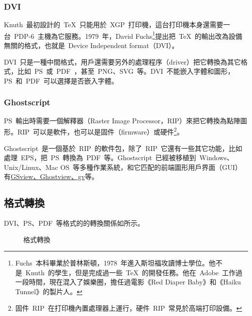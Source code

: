 \subsubsection{DVI}
\label{sec:dvi}
Knuth~最初設計的~\TeX~只能用於~XGP~打印機，這台打印機本身還需要一台~PDP-6~主機為它服務。1979~年，David Fuchs\footnote{Fuchs~本科畢業於普林斯頓，1978~年進入斯坦福攻讀博士學位。他不是~Knuth~的學生，但是完成過一些~\TeX~的開發任務。他在~Adobe~工作過一段時間，現在混入了娛樂圈，擔任過電影《Red Diaper Baby》和《Haiku Tunnel》的製片人。}提出把~\TeX~的輸出改為設備無關的格式，也就是~Device Independent format（DVI）。

DVI~只是一種中間格式，用戶還需要另外的處理程序（driver）把它轉換為其它格式，比如~PS~或~PDF~，甚至~PNG、SVG~等。DVI~不能嵌入字體和圖形，PS~和~PDF~可以選擇是否嵌入字體。

\subsubsection{Ghostscript}
\label{sec:ghostscript}
PS~輸出時需要一個解釋器（Raster Image Processor，RIP）來把它轉換為點陣圖形。RIP~可以是軟件，也可以是固件（firmware）或硬件\footnote{固件~RIP~在打印機內置處理器上運行，硬件~RIP~常見於高端打印設備。}。

Ghostscript~是一個基於~RIP~的軟件包，除了~RIP~它還有一些其它功能，比如處理~EPS，把~PS~轉換為~PDF~等。Ghostscript~已經被移植到~Windows、Unix/Linux、Mac OS~等多種作業系統，和它匹配的前端圖形用戶界面（GUI）有\href{http://pages.cs.wisc.edu/~ghost/}{GSview、Ghostview、gv}等。

\subsection{格式轉換}
\label{sec:convert_format}
DVI、PS、PDF~等格式的的轉換關係如所示。

\begin{figure}[htbp]
\centering
{}
\caption{格式轉換}
\label{fig:convert_format}
\end{figure}

